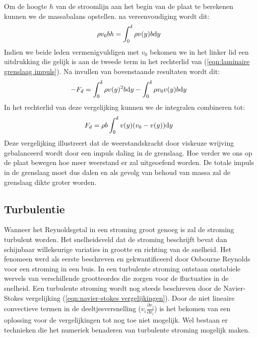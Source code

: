 Om de hoogte $h$ van de stroomlijn aan het begin van de plaat te berekenen kunnen we de massabalans opstellen. na vereenvoudiging wordt dit:
\begin{equation}
	\rho v_0 b h = \int_0^{\delta} \rho v(y) b \mathrm{d} y
\end{equation}
Indien we beide leden vermenigvuldigen met $v_0$ bekomen we in het linker lid een uitdrukking die gelijk is aan de tweede term in het rechterlid van (\ref{eqn:laminaire grenslaag impuls}). Na invullen van bovenstaande resultaten wordt dit:
\begin{equation}
	-F_d = \int_0^{\delta} \rho v(y)^2 b \mathrm{d} y  - \int_0^{\delta} \rho v_0 v(y) b \mathrm{d} y
\end{equation}
In het rechterlid van deze vergelijking kunnen we de integralen combineren tot:
\begin{equation}
	F_d = \rho b \int_0^{\delta} v(y)(v_0-v(y))\mathrm{d} y
\end{equation}
Deze vergelijking illustreert dat de weerstandskracht door viskeuze wrijving gebalanceerd wordt door een impuls daling in de grenslaag. Hoe verder we ons op de plaat bewegen hoe meer weerstand er zal uitgeoefend worden. De totale impuls in de grenslaag moet dus dalen en als gevolg van behoud van massa zal de grenslaag dikte groter worden.

		\subsection{Turbulentie}
Wanneer het Reynoldsgetal in een stroming groot genoeg is zal de stroming turbulent worden. Het snelheidsveld dat de stroming beschrijft bevat dan schijnbaar willekeurige variaties in grootte en richting van de snelheid. Het fenomeen werd als eerste beschreven en gekwantificeerd door Osbourne Reynolds voor een stroming in een buis. In een turbulente stroming ontstaan onstabiele wervels van verschillende grootteordes die zorgen voor de fluctuaties in de snelheid. Een turbulente stroming wordt nog steeds beschreven door de Navier-Stokes vergelijking (\ref{eqn:navier-stokes vergelijkingen}). Door de niet lineaire convectieve termen in de deeltjesversnelling ($v_i \frac{\partial v_j}{\partial x_i}$) is het bekomen van een oplossing voor de vergelijkingen tot nog toe niet mogelijk. Wel bestaan er technieken die het numeriek benaderen van turbulente stroming mogelijk maken.

